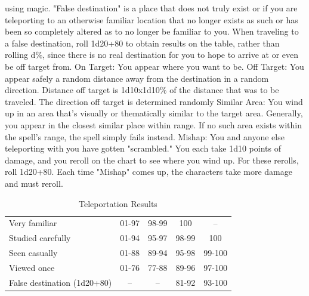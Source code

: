 using magic.
"False destination" is a place that does not truly exist or if you are teleporting
to an otherwise familiar location that no longer exists as such or has been so
completely altered as to no longer be familiar to you. When traveling to a false
destination, roll 1d20+80 to obtain results on the table, rather than rolling d\%,
since there is no real destination for you to hope to arrive at or even be off
target from.
On Target: You appear where you want to be.
Off Target: You appear safely a random distance away from the destination
in a random direction. Distance off target is 1d10x1d10\% of the distance that
was to be traveled. The direction off target is determined randomly
Similar Area: You wind up in an area that's visually or thematically similar
to the target area.
Generally, you appear in the closest similar place within range. If no such area
exists within the spell's range, the spell simply fails instead.
Mishap: You and anyone else teleporting with you have gotten "scrambled."
You each take 1d10 points of damage, and you reroll on the chart to see where you
wind up. For these rerolls, roll 1d20+80. Each time "Mishap" comes up, the characters
take more damage and must reroll.
\begin{table}[htb]
\caption{Teleportation Results}
\centering
\begin{tabular}{l c c c c}
Very familiar & 01-97 & 98-99 & 100 & --\\
Studied carefully & 01-94 & 95-97 & 98-99 & 100\\
Seen casually & 01-88 & 89-94 & 95-98 & 99-100\\
Viewed once & 01-76 & 77-88 & 89-96 & 97-100\\
False destination (1d20+80) & -- & -- & 81-92 & 93-100\\
\end{tabular}
\end{table}